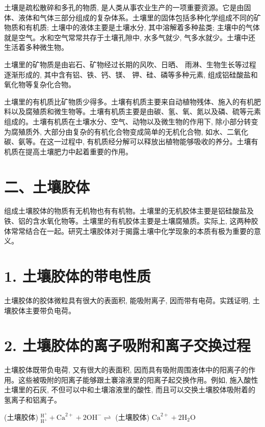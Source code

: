 \documentclass[10pt]{article}
\begin{document}
土壤是疏松散碎和多孔的物质, 是人类从事农业生产的一项重要资源。它是由固体、液体和气体三部分组成的复杂体系。土壤里的固体包括多种化学组成不同的矿物质和有机质; 土壤中的液体主要是土壤水分, 其中溶解着多种盐类; 主壤中的气体就是空气。水和空气常常共存于土壤孔隙中, 水多气就少, 气多水就少。土壤中还生活着多种微生物。

土壤里的矿物质是由岩石、矿物经过长期的风吹、日晒、 雨淋、生物生长等过程逐渐形成的, 其中含有铝、铁、钙、镁、 钾、硅、磷等多种元素, 组成铝硅酸盐和氧化物等复杂化合物。

土壤里的有机质比矿物质少得多。土壤有机质主要来自动植物残体、施入的有机肥料以及腐殖质和微生物等。土壤有机质主要是由碳、氢、氧、氮以及磷、硫等元素组成的。土壤有机质在土壤水分、空气、动物以及微生物的作用下, 除小部分转变为腐殖质外, 大部分由复杂的有机化合物变成简单的无机化合物, 如水、二氧化碳、氨等。在这一过程中, 有机质经分解可以释放出植物能够吸收的养分。土壤有机质在提高土壤肥力中起着重要的作用。

\section*{二、土壤胶体}

组成土壤胶体的物质有无机物也有有机物。土壤里的无机胶体主要是铝硅酸盐及铁、铝的含水氧化物等。土壤里的有机胶体主要是土壤腐殖质。实际上, 这两种胶体常常结合在一起。研究土壤胶体对于揭露土壤中化学现象的本质有极为重要的意义。

\section*{1. 土壤胶体的带电性质}

土壤胶体的胶体微粒具有很大的表面积, 能吸附离子, 因而带有电荷。实践证明, 土壤胶体主要带负电荷。

\section*{2. 土壤胶体的离子吸附和离子交换过程}

土壤胶体既带负电荷, 又有很大的表面积, 因而具有吸附周围液体中的阳离子的作用。这些被吸附的阳离子能够跟土褰溶液里的阳离子起交换作用。例如, 施入酸性土壤里的石灰, 不但可以中和土壤溶液里的酸性, 而且可以交换土壤胶体吸附着的氢离子和铝离子。

(土壤胶体) \({}_{{\mathrm{H}}^{ + }}^{{\mathrm{H}}^{ + }} + {\mathrm{{Ca}}}^{2 + } + 2{\mathrm{{OH}}}^{ - } \rightleftharpoons\) (土壤胶体) \({\mathrm{{Ca}}}^{2 + } + 2{\mathrm{H}}_{2}\mathrm{O}\)
\end{document}
